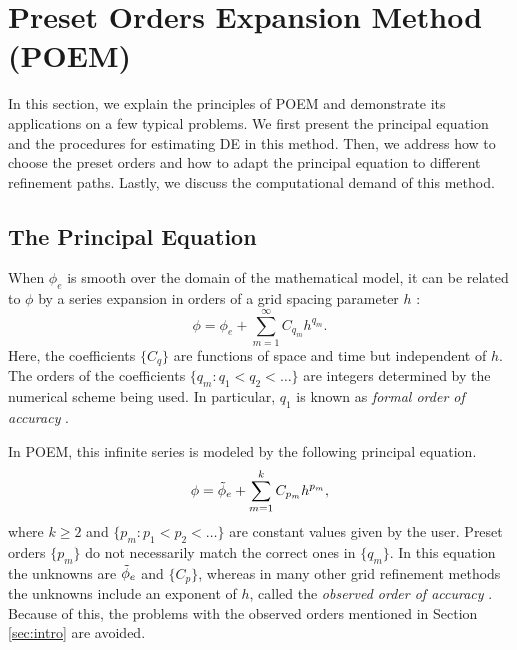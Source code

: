 \section{Preset Orders Expansion Method (POEM)} \label{sec:POEM}
In this section, we explain the principles of POEM and demonstrate its applications on a few typical problems. We first present the principal equation and the procedures for estimating DE in this method. Then, we address how to choose the preset orders and how to adapt the principal equation to different refinement paths. Lastly, we discuss the computational demand of this method.


\subsection{The Principal Equation}
When $\phi_e$ is smooth over the domain of the mathematical model, it can be related to $\phi$ by a series expansion in orders of a grid spacing parameter $h$ \cite{Roy2010}:
\begin{equation} \label{eq:model_infty}
    \phi = \phi_{e} + \sum_{m=1}^{\infty} C_{q_m} h^{q_m}.
\end{equation}
Here, the coefficients $\{C_{q}\}$ are functions of space and time but independent of $h$. The orders of the coefficients $\{q_m: q_1 < q_2 < \dots \}$ are integers determined by the numerical scheme being used. In particular, $q_1$ is known as \textit{formal order of accuracy} \citep{Roy2010}.

In POEM, this infinite series is modeled by the following principal equation.
\begin{equation} \label{eq:model_orig}
    \phi = \Tilde{\phi}_{e} + \sum_{m=1}^{k} C_{p_m} h^{p_m},
\end{equation}
where $k \ge 2$ and $\{p_m: p_1 < p_2 < \dots \}$ are constant values given by the user. Preset orders $\{p_m\}$ do not necessarily match the correct ones in $\{q_m\}$. In this equation the unknowns are $\Tilde{\phi}_e$ and $\{C_{p}\}$, whereas in many other grid refinement methods the unknowns include an exponent of $h$, called the \textit{observed order of accuracy} \cite{Roy2010,Orozco2010VerificationSolutions}. Because of this, the problems with the observed orders mentioned in Section \ref{sec:intro} are avoided.



